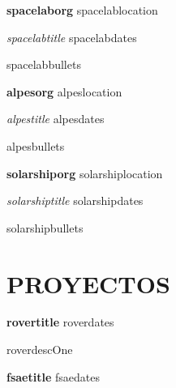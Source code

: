 \documentclass[10pt,a4paper]{article}
\newcommand{\projectOne}{rover}
\newcommand{\projectTwo}{fsae}
\newcommand{\jobOne}{spacelab}
\newcommand{\jobTwo}{alpes}
\newcommand{\jobFour}{solarship}
\newcommand{\get}[2]{\csname #1#2\endcsname}
\begin{document}
\textbf{\get{\jobOne}{org}} \hfill \get{\jobOne}{location}

\textit{\get{\jobOne}{title}} \hfill \get{\jobOne}{dates}

\begin{itemize}
    \get{\jobOne}{bullets}
\end{itemize}


\vspace{2pt}

\textbf{\get{\jobTwo}{org}} \hfill \get{\jobTwo}{location}

\textit{\get{\jobTwo}{title}} \hfill \get{\jobTwo}{dates}

\begin{itemize}
    \get{\jobTwo}{bullets}
\end{itemize}

\vspace{2pt}





\textbf{\get{\jobFour}{org}} \hfill \get{\jobFour}{location}

\textit{\get{\jobFour}{title}} \hfill \get{\jobFour}{dates}

\begin{itemize}
    \get{\jobFour}{bullets}
\end{itemize}

\vspace{2pt}



\hrulefill 
\section*{PROYECTOS}

\textbf{\get{\projectOne}{title}} \hfill \get{\projectOne}{dates}

\get{\projectOne}{descOne}

\vspace{4pt}

\textbf{\get{\projectTwo}{title}} \hfill \get{\projectTwo}{dates}
\end{document}
